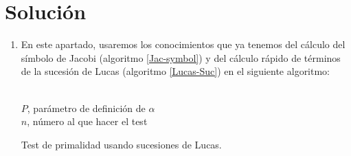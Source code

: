 \section*{Solución}
	\begin{enumerate}
		\item En este apartado, usaremos los conocimientos que ya tenemos del cálculo del símbolo de Jacobi (algoritmo
		\ref{Jac-symbol}) y del cálculo rápido de términos de la sucesión de Lucas (algoritmo \ref{Lucas-Suc}) en el
		siguiente algoritmo:
		
		\begin{algorithm}[H]
		\begin{algorithmic}[1]
			\REQUIRE \ \\
				\texttt{$P$}, parámetro de definición de $\alpha$ \\
				\texttt{$n$}, número al que hacer el test \\
				\ELSE
						\ENDIF
					\ENDFOR
				\ENDIF
					\ENDFOR
				\ELSE
				\ENDIF
			\ENDWHILE
			\ENDIF
		\end{algorithmic}
		\caption{Test de primalidad usando sucesiones de Lucas.}
		\label{Primarity}
		\end{algorithm}
		

\end{enumerate}
